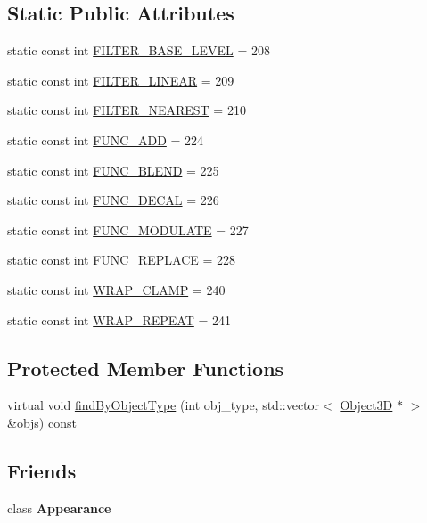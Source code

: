 \subsection*{Static Public Attributes}
\begin{CompactItemize}
\item 
static const int \hyperlink{classm3g_1_1Texture2D_d1924d32385b5353ad11ecd8b1ec0ad5}{FILTER\_\-BASE\_\-LEVEL} = 208
\item 
static const int \hyperlink{classm3g_1_1Texture2D_5f06003f50141919a3665d22f55602a8}{FILTER\_\-LINEAR} = 209
\item 
static const int \hyperlink{classm3g_1_1Texture2D_1ee2e06d6462fdafd5f17e63eddfb8fe}{FILTER\_\-NEAREST} = 210
\item 
static const int \hyperlink{classm3g_1_1Texture2D_825ea3aff59f79958257ac557c802760}{FUNC\_\-ADD} = 224
\item 
static const int \hyperlink{classm3g_1_1Texture2D_57e3e01014bbfd62b8665586fdd2ecb3}{FUNC\_\-BLEND} = 225
\item 
static const int \hyperlink{classm3g_1_1Texture2D_235b942b18219513ca4a5a8c1a3171ac}{FUNC\_\-DECAL} = 226
\item 
static const int \hyperlink{classm3g_1_1Texture2D_4482b0d4d6d1f64aaf33c3c5862de30e}{FUNC\_\-MODULATE} = 227
\item 
static const int \hyperlink{classm3g_1_1Texture2D_14f24332e168c5e210ddad47fb5cdd17}{FUNC\_\-REPLACE} = 228
\item 
static const int \hyperlink{classm3g_1_1Texture2D_e36d8facf5b60eb6c59888121731c438}{WRAP\_\-CLAMP} = 240
\item 
static const int \hyperlink{classm3g_1_1Texture2D_b37ff061b9fb272284c4c389deec9266}{WRAP\_\-REPEAT} = 241
\end{CompactItemize}
\subsection*{Protected Member Functions}
\begin{CompactItemize}
\item 
virtual void \hyperlink{classm3g_1_1Texture2D_4dadb21b568b0230fac106f15040138c}{findByObjectType} (int obj\_\-type, std::vector$<$ \hyperlink{classm3g_1_1Object3D}{Object3D} $\ast$ $>$ \&objs) const 
\end{CompactItemize}
\subsection*{Friends}
\begin{CompactItemize}
\item 
\hypertarget{classm3g_1_1Texture2D_afa5201a494f65c37039281d9b63a2a9}{
class \textbf{Appearance}}
\label{classm3g_1_1Texture2D_afa5201a494f65c37039281d9b63a2a9}

\end{CompactItemize}


